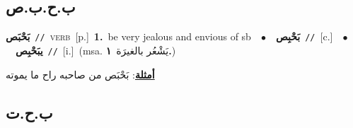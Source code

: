 \documentclass[10pt,a4paper,twoside]{article} %
\begin{document}
\begin{multicols}{2}
\vspace{-3mm}
\subsection*{\color{blue}\foreignlanguage{arabic}{ب.ح.ب.ص}\color{blue}{}} 

{\setlength\topsep{0pt}\textbf{\foreignlanguage{arabic}{بَحْبَص}}\ {\color{gray}\texttt{//}\color{black}}\ \textsc{verb}\ [p.]\ \textbf{1.}~be very jealous and envious of sb\ \ $\bullet$\ \ \setlength\topsep{0pt}\textbf{\foreignlanguage{arabic}{بَحْبِص}}\ {\color{gray}\texttt{//}\color{black}}\ [c.]\ \ $\bullet$\ \ \setlength\topsep{0pt}\textbf{\foreignlanguage{arabic}{يبَحْبِص}}\ {\color{gray}\texttt{//}\color{black}}\ [i.]\ \color{gray}(msa. \foreignlanguage{arabic}{يَشْعُر بالغيرَة}~\foreignlanguage{arabic}{\textbf{١.}})\color{black}\  \begin{flushright}\color{gray}\foreignlanguage{arabic}{\textbf{\underline{\foreignlanguage{arabic}{أمثلة}}}: بَحْبَص من صاحبه راح ما يموته}\end{flushright}\color{black}} \vspace{2mm}

\vspace{-3mm}
\subsection*{\color{blue}\foreignlanguage{arabic}{ب.ح.ت}\color{blue}{}} 


\end{multicols}
\end{document}
